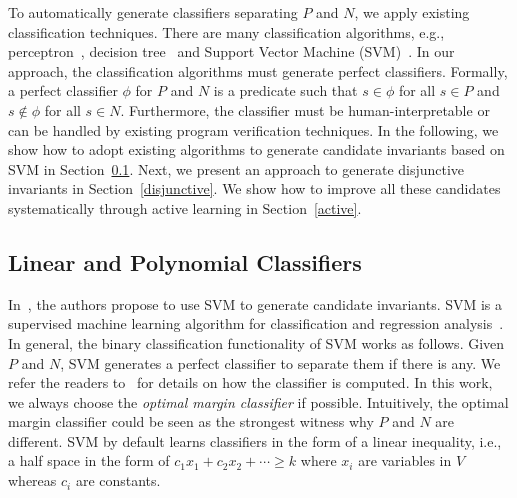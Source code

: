 To automatically generate classifiers separating $P$ and $N$, we apply existing classification techniques. There are many classification algorithms, e.g., perceptron~\cite{perceptron}, decision tree~\cite{quinlan1986induction} and Support Vector Machine (SVM)~\cite{svm:original}.
In our approach, the classification algorithms must generate perfect classifiers. Formally, a perfect classifier $\phi$ for $P$ and $N$ is a predicate such that $s \in \phi$ for all $s \in P$ and $s \not \in \phi$ for all $s \in N$. Furthermore, the classifier must be human-interpretable or can be handled by existing program verification techniques.
In the following, we show how to adopt existing algorithms to generate candidate invariants based on SVM in Section~\ref{existing}. Next, we present an approach to generate disjunctive invariants in Section~\ref{disjunctive}. We show how to improve all these candidates systematically through active learning in Section~\ref{active}.

\subsection{Linear and Polynomial Classifiers} \label{existing}
In~\cite{sharma2012interpolants}, the authors propose to use SVM to generate candidate invariants. SVM is a supervised machine learning algorithm for classification and regression analysis~\cite{svm:original}.
In general, the binary classification functionality of SVM works as follows. Given $P$ and $N$, SVM generates a perfect classifier to separate them if there is any.
We refer the readers to~\cite{svm:smo} for details on how the classifier is computed. In this work, we always choose the \textit{optimal margin classifier} if possible. Intuitively, the optimal margin classifier could be seen as the strongest witness why $P$ and $N$ are different.
SVM by default learns classifiers in the form of a linear inequality, i.e., a half space in the form of $c_1x_1 + c_2x_2 + \cdots \geq k$ where $x_i$ are variables in $V$ whereas $c_i$ are constants.

